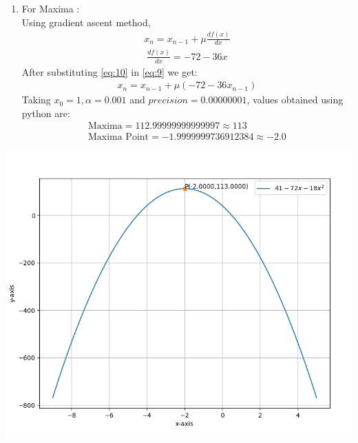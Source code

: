 \documentclass[journal,10pt,twocolumn]{article}
\begin{document}
\begin{enumerate}
\item For Maxima : \\
    Using gradient ascent method,
\begin{align}
    x_n=x_{n-1}+\mu\frac{df(x)}{dx} \label{eq:9}
    \end{align}
    \begin{align}
    \frac{df(x)}{dx}=-72-36x \label{eq:10}
\end{align}
After substituting \ref{eq:10} in \ref{eq:9} we get:
\begin{align}
    x_n=x_{n-1}+\mu(-72-36x_{n-1})\label{eq:11}
\end{align}
Taking $x_0 = 1, \alpha = 0.001$ and $precision = 0.00000001$, values obtained using python are:
\begin{align}
\boxed{\text{Maxima} = 112.99999999999997 \approx 113} \\
\boxed{\text{Maxima Point} = -1.9999999736912384 \approx -2.0}
\end{align}
\end{enumerate}

\includegraphics[width=1\columnwidth]{opt_basic.png}
\centering {}
\end{document}
